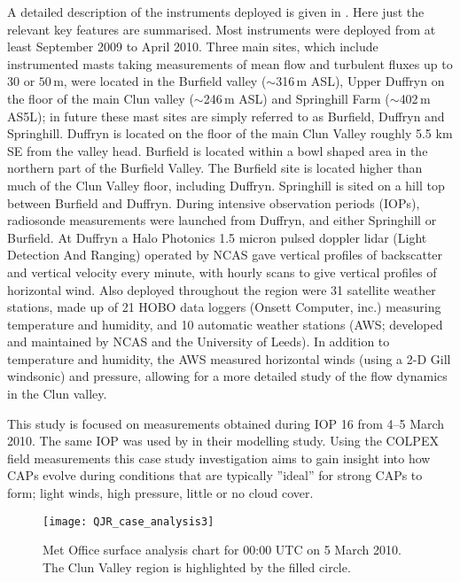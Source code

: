 \documentclass[times]{qjrms4}
\begin{document}
A detailed description of the instruments deployed is given in \citet{price2010COLPEX}. Here just the relevant key features are summarised. Most instruments were deployed from at least September 2009 to April 2010. Three main sites, which include instrumented masts taking measurements of mean flow and turbulent fluxes up to 30 or $50\,\mbox{m}$, were located in the Burfield valley ($\sim$316$\,\mbox{m}$ ASL), Upper Duffryn on the floor of the main Clun valley ($\sim$246$\,\mbox{m}$ ASL) and Springhill Farm ($\sim$402$\,\mbox{m}$ AS5L); in future these mast sites are simply referred to as Burfield, Duffryn and Springhill. Duffryn is located on the floor of the main Clun Valley roughly 5.5 km SE from the valley head. Burfield is located within a bowl shaped area in the northern part of the Burfield Valley. The Burfield site is located higher than much of the Clun Valley floor, including Duffryn. Springhill is sited on a hill top between Burfield and Duffryn. During intensive observation periods (IOPs), radiosonde measurements were launched from Duffryn, and either Springhill or Burfield. At Duffryn a Halo Photonics 1.5 micron pulsed doppler lidar (Light Detection And Ranging) operated by NCAS gave vertical profiles of backscatter and vertical velocity every minute, with hourly scans to give vertical profiles of horizontal wind. Also deployed throughout the region were 31 satellite weather stations, made up of 21 HOBO data loggers (Onsett Computer, inc.) measuring temperature and humidity, and 10 automatic weather stations (AWS; developed and maintained by NCAS and the University of Leeds). In addition to temperature and humidity, the AWS measured horizontal winds (using a 2-D Gill windsonic) and pressure, allowing for a more detailed study of the flow dynamics in the Clun valley.

This study is focused on measurements obtained during IOP 16 from 4--5 March 2010. The same IOP was used by \citet{Vosper2013narrow} in their modelling study. Using the COLPEX field measurements this case study investigation aims to gain insight into how CAPs evolve during conditions that are typically ''ideal'' for strong CAPs to form; light winds, high pressure, little or no cloud cover.
        \begin{figure}
        \centering
        \texttt{[image: QJR\_case\_analysis3]}
        \caption{Met Office surface analysis chart for 00:00 UTC on 5 March 2010. The Clun Valley region is highlighted by the filled circle.}
        \label{fig:metcharts}
        \end{figure}
        
\end{document}
